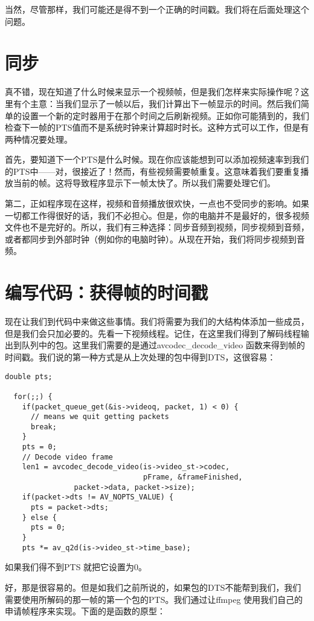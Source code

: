 当然，尽管那样，我们可能还是得不到一个正确的时间戳。我们将在后面处理这个问题。

\section{同步}

真不错，现在知道了什么时候来显示一个视频帧，但是我们怎样来实际操作呢？这里有个主意：当我们显示了一帧以后，我们计算出下一帧显示的时间。然后我们简单的设置一个新的定时器用于在那个时间之后刷新视频。正如你可能猜到的，我们检查下一帧的PTS值而不是系统时钟来计算超时时长。这种方式可以工作，但是有两种情况要处理。

首先，要知道下一个PTS是什么时候。现在你应该能想到可以添加视频速率到我们的PTS中——对，很接近了！然而，有些视频需要帧重复。这意味着我们要重复播放当前的帧。这将导致程序显示下一帧太快了。所以我们需要处理它们。

第二，正如程序现在这样，视频和音频播放很欢快，一点也不受同步的影响。如果一切都工作得很好的话，我们不必担心。但是，你的电脑并不是最好的，很多视频文件也不是完好的。所以，我们有三种选择：同步音频到视频，同步视频到音频，或者都同步到外部时钟（例如你的电脑时钟）。从现在开始，我们将同步视频到音频。
\section{编写代码：获得帧的时间戳}
现在让我们到代码中来做这些事情。我们将需要为我们的大结构体添加一些成员，但是我们会只加必要的。先看一下视频线程。记住，在这里我们得到了解码线程输出到队列中的包。这里我们需要的是通过avcodec_decode_video 函数来得到帧的时间戳。我们说的第一种方式是从上次处理的包中得到DTS，这很容易：

\begin{lstlisting}
double pts;

  for(;;) {
    if(packet_queue_get(&is->videoq, packet, 1) < 0) {
      // means we quit getting packets
      break;
    }
    pts = 0;
    // Decode video frame
    len1 = avcodec_decode_video(is->video_st->codec,
                                pFrame, &frameFinished,
                packet->data, packet->size);
    if(packet->dts != AV_NOPTS_VALUE) {
      pts = packet->dts;
    } else {
      pts = 0;
    }
    pts *= av_q2d(is->video_st->time_base);
\end{lstlisting}

如果我们得不到PTS 就把它设置为0。

好，那是很容易的。但是如我们之前所说的，如果包的DTS不能帮到我们，我们需要使用所解码的那一帧的第一个包的PTS。我们通过让ffmpeg 使用我们自己的申请帧程序来实现。下面的是函数的原型：


